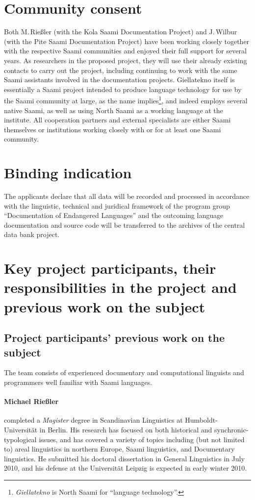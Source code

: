 \documentclass[a4paper,12pt]{article}
\begin{document}
{{\section{Community consent}
Both M.\,Rießler (with the Kola Saami Documentation Project) and J.\,Wilbur (with the Pite Saami Documentation Project) have been working closely together with the respective Saami communities and enjoyed their full support for several years. As researchers in the proposed project, they will use their already existing contacts to carry out the project, including continuing to work with the same Saami assistants involved in the documentation projects. Giellatekno itself is essentially a Saami project intended to produce language technology for use by the Saami community at large, as the name implies\footnote{{\it Giellatekno} is North Saami for “language technology”.}, and indeed employs several native Saami, as well as using North Saami as a working language at the institute. All cooperation partners and external specialists are either Saami themselves or institutions working closely with or for at least one Saami community.

\section{Binding indication}

The applicants declare that all data will be recorded and processed in accordance with the linguistic, technical and juridical framework of the program group “Documentation of Endangered Languages” and the outcoming language documentation and source code will be transferred to the archives of the central data bank project.

\section{Key project participants, their responsibilities in the project and previous work on the subject}

\subsection{Project participants' previous work on the subject}
The team consists of experienced documentary and computational linguists and programmers well familiar with Saami languages.

\paragraph{Michael Rießler} completed a \textit{Magister} degree in Scandinavian Linguistics at Humboldt-Universität in Berlin. His research has focused on both historical and synchronic-typological issues, and has covered a variety of topics including (but not limited to) areal linguistics in northern Europe, Saami linguistics, and Documentary linguistics. He submitted his doctoral dissertation in General Linguistics in July 2010, and his defense at the Universität Leipzig is expected in early winter 2010.

}}
\end{document}
